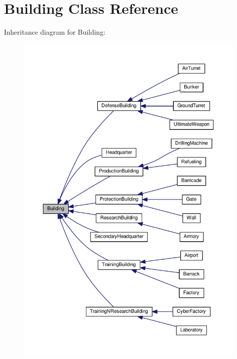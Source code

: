 \hypertarget{class_building}{}\section{Building Class Reference}
\label{class_building}


Inheritance diagram for Building\+:
\nopagebreak
\begin{figure}[H]
\begin{center}
\leavevmode
\includegraphics[width=350pt]{class_building__inherit__graph}
\end{center}
\end{figure}
